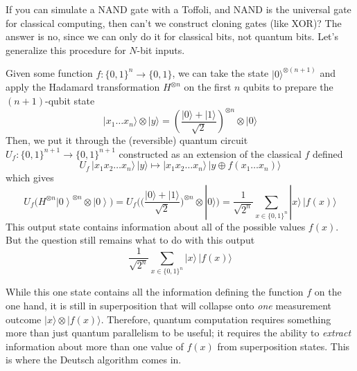 \documentclass{article}
\newcommand{\ket}[1]{\ensuremath{\left|#1\right\rangle}}
\begin{document}
      If you can simulate a NAND gate with a Toffoli, and NAND is the universal gate for classical computing, then can't we construct cloning gates (like XOR)? The answer is no, since we can only do it for classical bits, not quantum bits. Let's generalize this procedure for $N$-bit inputs. 

      \begin{theorem}
        Given some function $f: \{0, 1\}^n \longrightarrow \{0, 1\}$, we can take the state $|0\rangle^{\otimes (n+1)}$ and apply the Hadamard transformation $H^{\otimes n}$ on the first $n$ qubits to prepare the $(n+1)$-qubit state 
        \begin{equation} 
          |x_1 \ldots x_n \rangle \otimes |y\rangle = \left( \frac{|0\rangle + |1\rangle}{\sqrt{2}}\right)^{\otimes n} \otimes |0\rangle
        \end{equation}
        Then, we put it through the (reversible) quantum circuit $U_f: \{0, 1\}^{n+1} \longrightarrow \{0, 1\}^{n+1}$ constructed as an extension of the classical $f$ defined 
        \begin{equation} 
          U_f \, |x_1 x_2 \ldots x_n \rangle \, |y\rangle \mapsto |x_1 x_2 \ldots x_n \rangle \, |y \oplus f(x_1 \ldots x_n)\rangle
        \end{equation}
        which gives 
        \begin{equation} 
          U_f \big( H^{\otimes n} \ket{0}^{\otimes n} \otimes \ket{0} \big) = U_f \Bigg( \bigg( \frac{|0\rangle + |1\rangle}{\sqrt{2}} \bigg)^{\otimes n} \otimes |0\rangle \Bigg) = \frac{1}{\sqrt{2^n}} \sum_{x \in \{0, 1\}^n} |x\rangle \, |f(x)\rangle
        \end{equation}
        This output state contains information about all of the possible values $f(x)$. But the question still remains what to do with this output 
        \begin{equation} 
          \frac{1}{\sqrt{2^n}} \sum_{x \in \{0, 1\}^n} |x\rangle \, |f(x)\rangle
        \end{equation}
      \end{theorem}

      While this one state contains all the information defining the function $f$ on the one hand, it is still in superposition that will collapse onto \textit{one} measurement outcome $|x \rangle \otimes |f(x) \rangle$. Therefore, quantum computation requires something more than just quantum parallelism to be useful; it requires the ability to \textit{extract} information about more than one value of $f(x)$ from superposition states. This is where the Deutsch algorithm comes in. 
\end{document}
